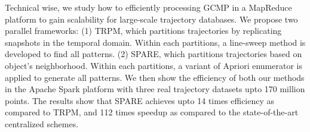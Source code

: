 

Technical wise, we study how to efficiently processing GCMP in a MapReduce platform to gain scalability for large-scale trajectory databases. We propose two parallel frameworks: (1) TRPM, which partitions trajectories by replicating snapshots in the temporal domain. Within each partitions, a line-sweep method is developed to find all patterns. (2) SPARE, which partitions trajectories based on object's neighborhood. Within each partitions, a variant of Apriori enumerator is applied to generate all patterns. We then show the efficiency of both our methods in the Apache Spark platform with three real trajectory datasets upto 170 million points. The results show that SPARE achieves upto 14 times efficiency as compared to TRPM, and 112 times speedup as compared to the state-of-the-art centralized schemes.
